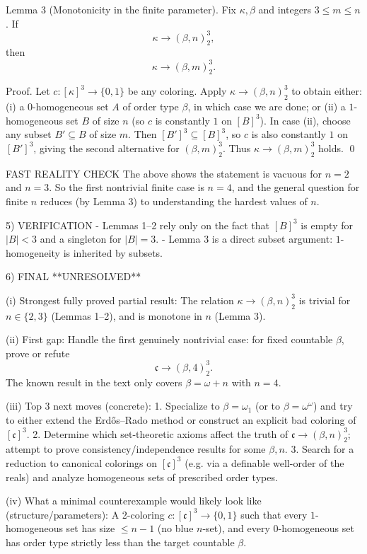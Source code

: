 Lemma 3 (Monotonicity in the finite parameter).
Fix $\kappa,\beta$ and integers $3\le m\le n$. If
\[\kappa\to(\beta,n)^3_2,\]
then
\[\kappa\to(\beta,m)^3_2.\]

Proof.
Let $c:[\kappa]^3\to\{0,1\}$ be any coloring.
Apply $\kappa\to(\beta,n)^3_2$ to obtain either:
(i) a $0$-homogeneous set $A$ of order type $\beta$, in which case we are done; or
(ii) a $1$-homogeneous set $B$ of size $n$ (so $c$ is constantly $1$ on $[B]^3$).
In case (ii), choose any subset $B'\subseteq B$ of size $m$.
Then $[B']^3\subseteq[B]^3$, so $c$ is also constantly $1$ on $[B']^3$, giving the second alternative for $(\beta,m)^3_2$.
Thus $\kappa\to(\beta,m)^3_2$ holds. \qed

FAST REALITY CHECK
The above shows the statement is vacuous for $n=2$ and $n=3$.
So the first nontrivial finite case is $n=4$, and the general question for finite $n$ reduces (by Lemma 3) to understanding the hardest values of $n$.

5) VERIFICATION
- Lemmas 1--2 rely only on the fact that $[B]^3$ is empty for $|B|<3$ and a singleton for $|B|=3$.
- Lemma 3 is a direct subset argument: $1$-homogeneity is inherited by subsets.

6) FINAL
**UNRESOLVED**

(i) Strongest fully proved partial result:
The relation $\kappa\to(\beta,n)^3_2$ is trivial for $n\in\{2,3\}$ (Lemmas 1--2), and is monotone in $n$ (Lemma 3).

(ii) First gap:
Handle the first genuinely nontrivial case: for fixed countable $\beta$, prove or refute
\[\mathfrak c\to(\beta,4)^3_2.\]
The known result in the text only covers $\beta=\omega+n$ with $n=4$.

(iii) Top 3 next moves (concrete):
1. Specialize to $\beta=\omega_1$ (or to $\beta=\omega^\omega$) and try to either extend the Erd\H{o}s--Rado method or construct an explicit bad coloring of $[\mathfrak c]^3$.
2. Determine which set-theoretic axioms affect the truth of $\mathfrak c\to(\beta,n)^3_2$; attempt to prove consistency/independence results for some $\beta,n$.
3. Search for a reduction to canonical colorings on $[\mathfrak c]^3$ (e.g. via a definable well-order of the reals) and analyze homogeneous sets of prescribed order types.

(iv) What a minimal counterexample would likely look like (structure/parameters):
A 2-coloring $c:[\mathfrak c]^3\to\{0,1\}$ such that every $1$-homogeneous set has size $\le n-1$ (no blue $n$-set),
and every $0$-homogeneous set has order type strictly less than the target countable $\beta$.


